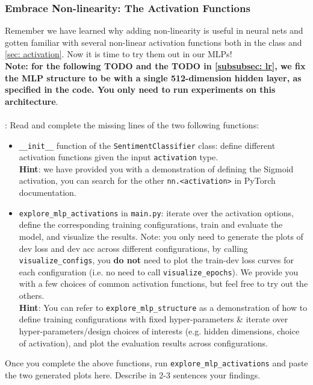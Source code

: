 \subsubsection{Embrace Non-linearity: The Activation Functions}
Remember we have learned why adding non-linearity is useful in neural nets and gotten familiar with several non-linear activation functions both in the class and \autoref{sec: activation}. Now it is time to try them out in our MLPs! \\
\textbf{Note: for the following TODO and the TODO in \autoref{subsubsec: lr}, we fix the MLP structure to be with a single 512-dimension hidden layer, as specified in the code. You only need to run experiments on this architecture}.\\\\
\noindent\todo{}: Read and complete the missing lines of the two following functions:
\begin{itemize}
    \item \texttt{\_\_init\_\_} function of the \texttt{SentimentClassifier} class: define different activation functions given the input \texttt{activation} type.\\
    \textbf{Hint}: we have provided you with a demonstration of defining the Sigmoid activation, you can search for the other \texttt{nn.<activation>} in PyTorch documentation.\\
    \item \texttt{explore\_mlp\_activations} in \texttt{main.py}: iterate over the activation options, define the corresponding training configurations, train and evaluate the model, and visualize the results. Note: you only need to generate the plots of dev loss and dev acc across different configurations, by calling \texttt{visualize\_configs}, you \textbf{do not} need to plot the train-dev loss curves for each configuration (i.e. no need to call \texttt{visualize\_epochs}). We provide you with a few choices of common activation functions, but feel free to try out the others.\\
    \textbf{Hint}: You can refer to \texttt{explore\_mlp\_structure} as a demonstration of how to define training configurations with fixed hyper-parameters \& iterate over hyper-parameters/design choices of interests (e.g. hidden dimensions, choice of activation), and plot the evaluation results across configurations. 
\end{itemize}
Once you complete the above functions, run \texttt{explore\_mlp\_activations} and paste the two generated plots here. Describe in 2-3 sentences your findings.\\
